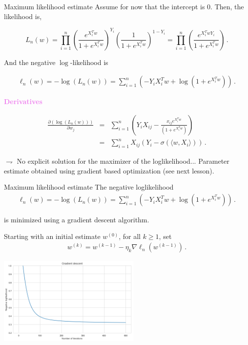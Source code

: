 \documentclass[xcolor={usenames,dvipsnames},handout]{beamer}
\begin{document}
\begin{frame}{Maximum likelihood estimate}
Assume for now that the intercept is 0. Then, the likelihood is,

$$
L_n(w)  =  \prod_{i=1}^n \left(\frac{e^{X_i^Tw}}{1+e^{X_i^T w}} \right)^{Y_i} \left(\frac{1}{1+e^{X_i^T w}} \right)^{1-Y_i} = \prod_{i=1}^n \left(\frac{e^{X_i^Tw Y_i}}{1+e^{X_i^T w}} \right)\,.
$$

And the \alert{negative $\log$-likelihood} is

\begin{align*}
\ell_n(w) = - \log(L_n(w)) =  \sum_{i=1}^n \left(-Y_i X_i^T w+ \log(1+ e^{X_i^Tw})\right)\,.
\end{align*}

{\bf\textcolor{violet}{Derivatives}}


\begin{eqnarray*}
\frac{\partial \left(\log(L_n(w))\right)}{\partial w_j}&= &
\sum_{i=1}^n \left(Y_i X_{ij}
	- \frac{x_{ij} e^{X_i^T
	w}}{(1+ e^{X_i^T
	w})}   \right) \\
&=& \sum_{i=1}^n X_{ij} \left(Y_i - \sigma(\langle w,X_i \rangle)\right)\,.
\end{eqnarray*}

$\rightharpoondown$ \alert{No explicit solution} for the maximizer of the loglikelihood... Parameter estimate obtained using \alert{gradient based optimization} (see next lesson).

\end{frame}

\begin{frame}{Maximum likelihood estimate}
The negative loglikelihood
\begin{align*}
\ell_n(w) = - \log(L_n(w)) =  \sum_{i=1}^n \left(-Y_i X_i^T w+ \log(1+ e^{X_i^Tw})\right)\,.
\end{align*}

is minimized using a gradient descent algorithm. 

Starting with an \alert{initial estimate $w^{(0)}$}, for all $k\geqslant 1$, set
\begin{align*}
w^{(k)} = w^{(k-1)} - \eta_k \nabla \ell_n(w^{(k-1)})\,.
\end{align*}

\begin{center}
\includegraphics[width = 7cm]{gradient_descent.png}
\end{center}

\end{frame}
\end{document}
